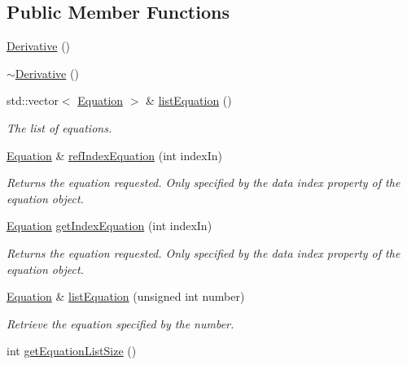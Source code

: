 \subsection*{Public Member Functions}
\begin{DoxyCompactItemize}
\item 
\hyperlink{classosea_1_1ofreq_1_1_derivative_adc03ec3ad150bc0de66a3e7200cd368f}{Derivative} ()
\item 
\hyperlink{classosea_1_1ofreq_1_1_derivative_a7fc4ee53f460dfb98b3db2e9c9830cf9}{$\sim$\-Derivative} ()
\item 
std\-::vector$<$ \hyperlink{classosea_1_1ofreq_1_1_equation}{Equation} $>$ \& \hyperlink{classosea_1_1ofreq_1_1_derivative_a7fa63ee738fcafcf3fccb796da095946}{list\-Equation} ()
\begin{DoxyCompactList}\small\item\em The list of equations. \end{DoxyCompactList}\item 
\hyperlink{classosea_1_1ofreq_1_1_equation}{Equation} \& \hyperlink{classosea_1_1ofreq_1_1_derivative_a432dcf928635e6f77801ae7b546656fe}{ref\-Index\-Equation} (int index\-In)
\begin{DoxyCompactList}\small\item\em Returns the equation requested. Only specified by the data index property of the equation object. \end{DoxyCompactList}\item 
\hyperlink{classosea_1_1ofreq_1_1_equation}{Equation} \hyperlink{classosea_1_1ofreq_1_1_derivative_af9b75e66d998bc3ad82250c6667d0c17}{get\-Index\-Equation} (int index\-In)
\begin{DoxyCompactList}\small\item\em Returns the equation requested. Only specified by the data index property of the equation object. \end{DoxyCompactList}\item 
\hyperlink{classosea_1_1ofreq_1_1_equation}{Equation} \& \hyperlink{classosea_1_1ofreq_1_1_derivative_a57fc9f8fc2bb6b416b9ade4f79f2bf1d}{list\-Equation} (unsigned int number)
\begin{DoxyCompactList}\small\item\em Retrieve the equation specified by the number. \end{DoxyCompactList}\item 
int \hyperlink{classosea_1_1ofreq_1_1_derivative_ac95af6fb993314a578b3f0d3cd57a9cc}{get\-Equation\-List\-Size} ()
\end{DoxyCompactItemize}
